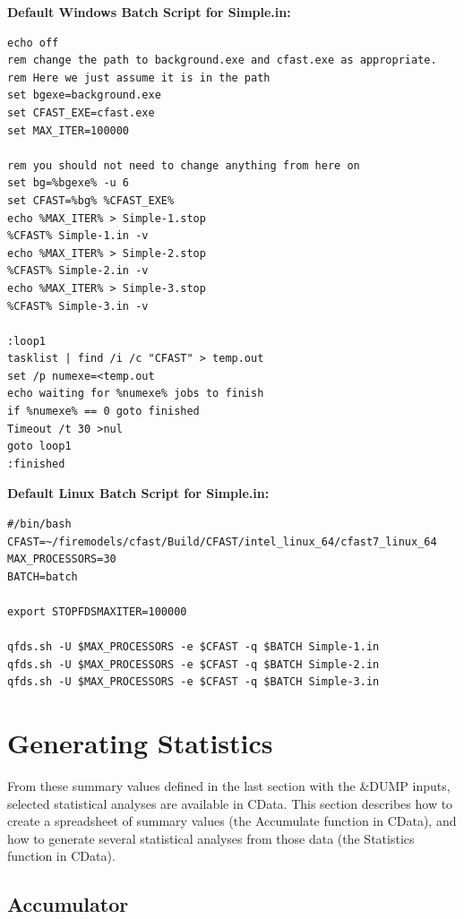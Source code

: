\documentclass[12pt,twoside]{book}
\begin{document}
\vspace{\baselineskip}
\noindent \textbf{Default Windows Batch Script for Simple.in:}

\begin{lstlisting}[basicstyle=\scriptsize]
echo off
rem change the path to background.exe and cfast.exe as appropriate.
rem Here we just assume it is in the path
set bgexe=background.exe
set CFAST_EXE=cfast.exe
set MAX_ITER=100000

rem you should not need to change anything from here on
set bg=%bgexe% -u 6
set CFAST=%bg% %CFAST_EXE%
echo %MAX_ITER% > Simple-1.stop
%CFAST% Simple-1.in -v
echo %MAX_ITER% > Simple-2.stop
%CFAST% Simple-2.in -v
echo %MAX_ITER% > Simple-3.stop
%CFAST% Simple-3.in -v

:loop1
tasklist | find /i /c "CFAST" > temp.out
set /p numexe=<temp.out
echo waiting for %numexe% jobs to finish
if %numexe% == 0 goto finished
Timeout /t 30 >nul
goto loop1
:finished
\end{lstlisting}

\vspace{\baselineskip}
\noindent \textbf{Default Linux Batch Script for Simple.in:}

\begin{lstlisting}[basicstyle=\scriptsize]
#/bin/bash
CFAST=~/firemodels/cfast/Build/CFAST/intel_linux_64/cfast7_linux_64
MAX_PROCESSORS=30
BATCH=batch

export STOPFDSMAXITER=100000

qfds.sh -U $MAX_PROCESSORS -e $CFAST -q $BATCH Simple-1.in
qfds.sh -U $MAX_PROCESSORS -e $CFAST -q $BATCH Simple-2.in
qfds.sh -U $MAX_PROCESSORS -e $CFAST -q $BATCH Simple-3.in
\end{lstlisting}

\section{Generating Statistics}

From these summary values defined in the last section with the {\ct \&DUMP} inputs, selected statistical analyses are available in CData. This section describes how to create a spreadsheet of summary values (the Accumulate function in CData), and how to generate several statistical analyses from those data (the Statistics function in CData).

\subsection{Accumulator}
\end{document}

